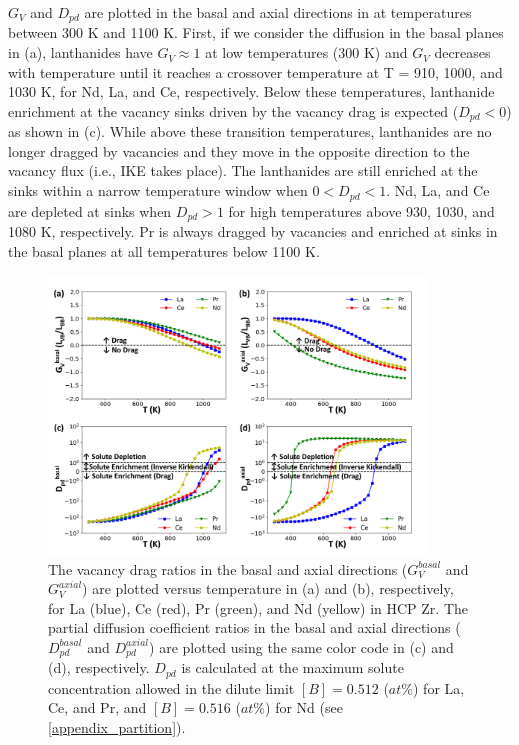 \documentclass[preprint,12pt]{elsarticle}
\begin{document}
$G_V$ and $D_{pd}$ are plotted in the basal and axial directions in  at temperatures between 300 K and 1100 K. First, if we consider the diffusion in the basal planes in (a), lanthanides have $G_V \approx 1$ at low temperatures (300 K) and $G_V$ decreases with temperature until it reaches a crossover temperature at T = 910, 1000, and 1030 K, for Nd, La, and Ce, respectively. Below these temperatures, lanthanide enrichment at the vacancy sinks driven by the vacancy drag is expected ($D_{pd} < 0$) as shown in (c). While above these transition temperatures, lanthanides are no longer dragged by vacancies and they move in the opposite direction to the vacancy flux (i.e., IKE takes place). The lanthanides are still enriched at the sinks within a narrow temperature window when $ 0 < D_{pd} < 1$. Nd, La, and Ce are depleted at sinks when $ D_{pd} > 1$ for high temperatures above 930, 1030, and 1080 K, respectively.
Pr is always dragged by vacancies and enriched at sinks in the basal planes at all temperatures below 1100 K.



\begin{figure}[h!]
    \centering
    \includegraphics[width=0.9\textwidth]{6_drag_pdc_basal_axial_updated.jpg}
    \caption{The vacancy drag ratios in the basal and axial directions ($G_V^{basal}$ and $G_V^{axial}$) are plotted versus temperature in (a) and (b), respectively, for La (blue), Ce (red), Pr (green), and Nd (yellow) in HCP Zr. The partial diffusion coefficient ratios in the basal and axial directions ($D_{pd}^{basal}$ and $D_{pd}^{axial}$) are plotted using the same color code in (c) and (d), respectively. $D_{pd}$ is calculated at the maximum solute concentration allowed in the dilute limit $[B] = 0.512$ ($at\%$) for La, Ce, and Pr, and $[B] = 0.516$ ($at\%$) for Nd (see \ref{appendix_partition}).}
    \label{fig:drag_ratios}
\end{figure}
\end{document}
